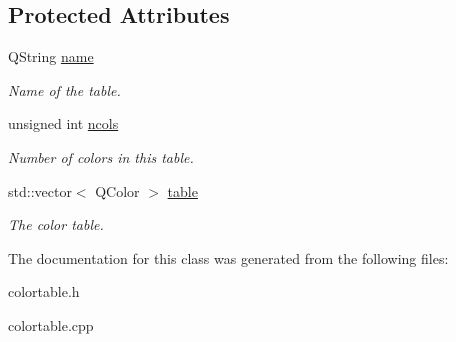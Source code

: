\subsection*{Protected Attributes}
\begin{DoxyCompactItemize}
\item 
\hypertarget{classColorTable_a78aa75d8350d48ed3432f8bfcf4e1906}{
QString \hyperlink{classColorTable_a78aa75d8350d48ed3432f8bfcf4e1906}{name}}
\label{classColorTable_a78aa75d8350d48ed3432f8bfcf4e1906}

\begin{DoxyCompactList}\small\item\em Name of the table. \item\end{DoxyCompactList}\item 
\hypertarget{classColorTable_af1da6b94f11b1f68316400ca082a368f}{
unsigned int \hyperlink{classColorTable_af1da6b94f11b1f68316400ca082a368f}{ncols}}
\label{classColorTable_af1da6b94f11b1f68316400ca082a368f}

\begin{DoxyCompactList}\small\item\em Number of colors in this table. \item\end{DoxyCompactList}\item 
\hypertarget{classColorTable_adbcf44aa55c66aa64eb009446b303665}{
std::vector$<$ QColor $>$ \hyperlink{classColorTable_adbcf44aa55c66aa64eb009446b303665}{table}}
\label{classColorTable_adbcf44aa55c66aa64eb009446b303665}

\begin{DoxyCompactList}\small\item\em The color table. \item\end{DoxyCompactList}\end{DoxyCompactItemize}


The documentation for this class was generated from the following files:\begin{DoxyCompactItemize}
\item 
colortable.h\item 
colortable.cpp\end{DoxyCompactItemize}
